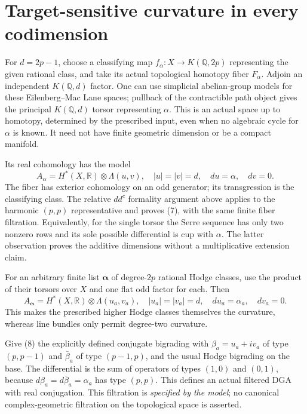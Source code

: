 \documentclass[11pt]{article}
\newcommand{\Q}{\mathbb Q}
\newcommand{\R}{\mathbb R}
\begin{document}
\section{Target-sensitive curvature in every codimension}
For $d=2p-1$, choose a classifying map
$f_\alpha:X\to K(\Q,2p)$ representing the given rational class, and take
its actual topological homotopy fiber $F_\alpha$. Adjoin an independent
$K(\Q,d)$ factor. One can use simplicial abelian-group models for these
Eilenberg--Mac Lane spaces; pullback of the contractible path object gives
the principal $K(\Q,d)$ torsor representing $\alpha$. This is an actual
space up to homotopy, determined by the prescribed input, even when no
algebraic cycle for $\alpha$ is known. It need not have finite geometric
dimension or be a compact manifold.

Its real cohomology has the model
\[
 A_\alpha=H^*(X,\R)\otimes\Lambda(u,v),\quad |u|=|v|=d,
 \quad du=\alpha,\quad dv=0.                                          \tag{7}
\]
The fiber has exterior cohomology on an odd generator; its transgression is
the classifying class. The relative $dd^c$ formality argument above applies
to the harmonic $(p,p)$ representative and proves (7), with the same finite
fiber filtration. Equivalently, for the single torsor the Serre sequence has
only two nonzero rows and its sole possible differential is cup with
$\alpha$. The latter observation proves the additive dimensions without a
multiplicative extension claim.

For an arbitrary finite list $\boldsymbol\alpha$ of degree-$2p$ rational
Hodge classes, use the product of their torsors over $X$ and one flat odd
factor for each. Then
\[
 A_{\boldsymbol\alpha}=H^*(X,\R)\otimes\Lambda(u_a,v_a),\quad
 |u_a|=|v_a|=d,\quad du_a=\alpha_a,\quad dv_a=0.                       \tag{8}
\]
This makes the prescribed higher Hodge classes themselves the curvature,
whereas line bundles only permit degree-two curvature.

Give (8) the explicitly defined conjugate bigrading with
$\beta_a=u_a+i v_a$ of type $(p,p-1)$ and $\bar\beta_a$ of type $(p-1,p)$,
and the usual Hodge bigrading on the base. The differential is the sum of
operators of types $(1,0)$ and $(0,1)$, because $d\beta_a=d\bar\beta_a=
\alpha_a$ has type $(p,p)$. This defines an actual filtered DGA with real
conjugation. This filtration is \emph{specified by the model}; no canonical
complex-geometric filtration on the topological space is asserted.
\end{document}
